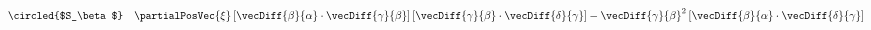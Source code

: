 \begin{align}
  \text{\circled{$S_\beta$}} &\quad\partialPosVec{\xi}\left[
    \vecDiff{\beta}{\alpha} \cdot \vecDiff{\gamma}{\beta}
  \right]\left[
    \vecDiff{\gamma}{\beta} \cdot \vecDiff{\delta}{\gamma}
  \right] - \vecDiff{\gamma}{\beta}^2 \left[
    \vecDiff{\beta}{\alpha} \cdot \vecDiff{\delta}{\gamma}
  \right]\\
\end{align}
